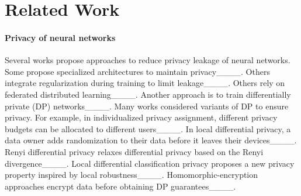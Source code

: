 \section{Related Work}
\label{sec:related_work}

\begin{comment}
\paragraph{Privacy in neural networks}
Several works propose privacy attacks in neural networks, shown to be effective even in settings where only labels are accessible____. %
Other works propose approaches to reduce privacy leakage. 
Some works suggest networks with specialized architectures designed for privacy____. 
Others integrate regularization terms during training to limit the privacy leakage____. 
Others provide probabilistic guarantees by relying on federated distributed training____ or training differentially private networks____.  
A recent work introduces the property local differential classification privacy and provides for it probabilistic guarantees____. 

\end{comment}


\paragraph{Privacy of neural networks}
Several works propose approaches to reduce privacy leakage of neural networks. 
Some propose specialized architectures to maintain privacy____. 
Others integrate regularization during training to limit leakage____. 
Others rely on federated distributed learning____. 
Another approach is to train differentially private (DP) networks____. 
Many works considered variants of DP to ensure privacy. For example, in individualized privacy assignment, different privacy budgets can be allocated to different users____. 
In local differential privacy, a data owner adds randomization to their data before it leaves their devices____. Renyi differential privacy relaxes differential privacy based on the Renyi divergence____. Local differential classification privacy proposes a new privacy property inspired by local robustness____. Homomorphic-encryption approaches encrypt data before obtaining DP guarantees____. 
 
